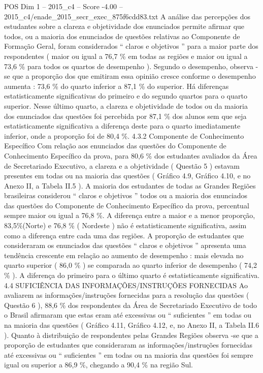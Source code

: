 \begin{textsample}{POS Dim 1 – 2015\_c4 – Score -4.00 – 2015\_c4/enade\_2015\_secr\_exec\_875f6cdd83.txt}
A análise das percepções dos estudantes sobre a clareza e objetividade dos enunciados permite afirmar que todos, ou a maioria dos enunciados de questões relativas ao Componente de Formação Geral, foram considerados “ claros e objetivos ” para a maior parte dos respondentes ( maior ou igual a 76,7 \% em todas as regiões e maior ou igual a 73,6 \% para todos os quartos de desempenho ).
Segundo o desempenho, observa -se que a proporção dos que emitiram essa opinião cresce conforme o desempenho aumenta : 73,6 \% do quarto inferior a 87,1 \% do superior.
Há diferenças estatisticamente significativas do primeiro e do segundo quartos para o quarto superior.
Nesse último quarto, a clareza e objetividade de todos ou da maioria dos enunciados das questões foi percebida por 87,1 \% dos alunos sem que seja estatisticamente significativa a diferença deste para o quarto imediatamente inferior, onde a proporção foi de 80,4 \%. 4.3.2 Componente de Conhecimento Específico Com relação aos enunciados das questões do Componente de Conhecimento Específico da prova, para 80,6 \% dos estudantes avaliados da Área de Secretariado Executivo, a clareza e a objetividade ( Questão 5 ) estavam presentes em todas ou na maioria das questões ( Gráfico 4.9, Gráfico 4.10, e no Anexo II, a Tabela II.5 ).
A maioria dos estudantes de todas as Grandes Regiões brasileiras considerou “ claros e objetivos ” todos ou a maioria dos enunciados das questões do Componente de Conhecimento Específico da prova, percentual sempre maior ou igual a 76,8 \%.
A diferença entre a maior e a menor proporção, 83,5\%(Norte) e 76,8 \% ( Nordeste ) não é estatisticamente significativa, assim como a diferença entre cada uma das regiões.
A proporção de estudantes que consideraram os enunciados das questões “ claros e objetivos ” apresenta uma tendência crescente em relação ao aumento de desempenho : mais elevada no quarto superior ( 86,0 \% ) se comparada ao quarto inferior de desempenho ( 74,2 \% ).
A diferença do primeiro para o último quarto é estatisticamente significativa. 4.4 SUFICIÊNCIA DAS INFORMAÇÕES/INSTRUÇÕES FORNECIDAS Ao avaliarem as informações/instruções fornecidas para a resolução das questões ( Questão 6 ), 88,6 \% dos respondentes da Área de Secretariado Executivo de todo o Brasil afirmaram que estas eram até excessivas ou “ suficientes ” em todas ou na maioria das questões ( Gráfico 4.11, Gráfico 4.12, e, no Anexo II, a Tabela II.6 ).
Quanto à distribuição de respondentes pelas Grandes Regiões observa -se que a proporção de estudantes que consideraram as informações/instruções fornecidas até excessivas ou “ suficientes ” em todas ou na maioria das questões foi sempre igual ou superior a 86,9 \%, chegando a 90,4 \% na região Sul.

\end{textsample}
